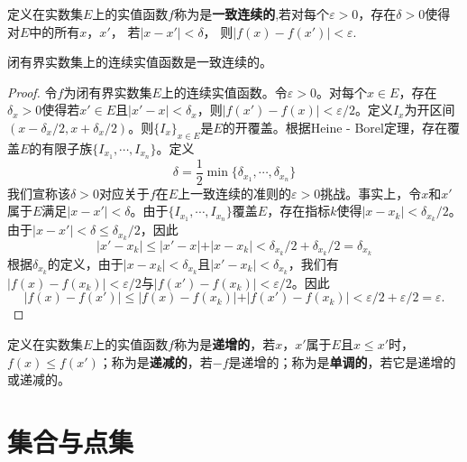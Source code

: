 \documentclass[lang=cn,newtx,10pt,scheme=chinese]{../Template/elegantbook}
\begin{document}
\begin{definition}[一致连续]\label{definition:一致连续}
  定义在实数集\(E\)上的实值函数\(f\)称为是\textbf{一致连续的},若对每个\(\varepsilon>0\)，存在\(\delta>0\)使得对\(E\)中的所有\(x\)，\(x'\)，
若\(\vert x - x'\vert<\delta\)， 则\(\vert f(x) - f(x')\vert<\varepsilon.\)
\end{definition}

\begin{theorem}\label{theorem:闭有界实数集上的连续实值函数是一致连续的。}
  闭有界实数集上的连续实值函数是一致连续的。
\end{theorem}
\begin{proof}
  令\(f\)为闭有界实数集\(E\)上的连续实值函数。令\(\varepsilon>0\)。对每个\(x\in E\)，存在\(\delta_x>0\)使得若\(x'\in E\)且\(\vert x' - x\vert<\delta_x\)，则\(\vert f(x') - f(x)\vert<\varepsilon/2\)。定义\(I_x\)为开区间\((x - \delta_x/2, x+\delta_x/2)\)。则\(\{I_x\}_{x\in E}\)是\(E\)的开覆盖。根据Heine - Borel定理，存在覆盖\(E\)的有限子族\(\{I_{x_1}, \cdots, I_{x_n}\}\)。定义
\[
\delta=\frac{1}{2}\min\{\delta_{x_1},\cdots,\delta_{x_n}\}
\]
我们宣称该\(\delta>0\)对应关于\(f\)在\(E\)上一致连续的准则的\(\varepsilon>0\)挑战。事实上，令\(x\)和\(x'\)属于\(E\)满足\(\vert x - x'\vert<\delta\)。由于\(\{I_{x_1}, \cdots, I_{x_n}\}\)覆盖\(E\)，存在指标\(k\)使得\(\vert x - x_k\vert<\delta_{x_k}/2\)。由于\(\vert x - x'\vert<\delta\leqslant\delta_{x_k}/2\)，因此
\[
\vert x' - x_k\vert\leqslant\vert x' - x\vert+\vert x - x_k\vert<\delta_{x_k}/2+\delta_{x_k}/2=\delta_{x_k}
\]
根据\(\delta_{x_k}\)的定义，由于\(\vert x - x_k\vert<\delta_{x_k}\)且\(\vert x' - x_k\vert<\delta_{x_k}\)，我们有\(\vert f(x) - f(x_k)\vert<\varepsilon/2\)与\(\vert f(x') - f(x_k)\vert<\varepsilon/2\)。因此
\[
\vert f(x) - f(x')\vert\leqslant\vert f(x) - f(x_k)\vert+\vert f(x') - f(x_k)\vert<\varepsilon/2+\varepsilon/2=\varepsilon.
\]

\end{proof}

\begin{definition}[实值函数的单调性]\label{definition:实值函数的单调性}
  定义在实数集\(E\)上的实值函数\(f\)称为是\textbf{递增的}，若\(x\)，\(x'\)属于\(E\)且\(x\leqslant x'\)时，\(f(x)\leqslant f(x')\)；称为是\textbf{递减的}，若\(-f\)是递增的；称为是\textbf{单调的}，若它是递增的或递减的。
\end{definition}




\chapter{集合与点集}
\end{document}
